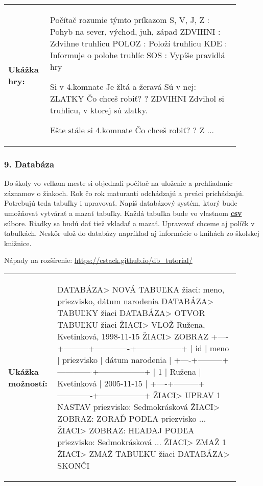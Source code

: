\begin{tabular}{@{}p{0.15\linewidth}p{0.75\linewidth}}
\textbf{\small Ukážka hry:} &
\vspace{-3em}
\begin{code}
Počítač rozumie týmto príkazom
S, V, J, Z   : Pohyb na sever, východ, juh, západ
ZDVIHNI		 : Zdvihne truhlicu
POLOZ		 : Položí truhlicu
KDE			 : Informuje o polohe truhlíc
SOS			 : Vypíše pravidlá hry

Si v 4.komnate
Je žltá a žeravá
Sú v nej: ZLATKY
Čo chceš robiť?
? ZDVIHNI
Zdvihol si truhlicu, v ktorej sú zlatky.

Ešte stále si 4.komnate
Čo chceš robiť?
? Z
...
\end{code}
\end{tabular}
\vspace{-2em}

\subsubsection*{9. Databáza}
Do školy vo veľkom meste si objednali počítač na uloženie a prehliadanie záznamov o žiakoch. Rok čo rok maturanti odchádzajú a prváci prichádzajú. Potrebujú teda tabuľky i upravovať. Napíš databázový systém, ktorý bude umožňovať vytvárať a mazať tabuľky. Každá tabuľka bude vo vlastnom \underline{\textbf{csv}} súbore. Riadky sa budú dať tiež vkladať a mazať.  Upravovať chceme aj políčk v tabuľkách. Neskôr ulož do databázy napríklad aj informácie o knihách zo školskej knižnice.

Nápady na rozšírenie: \url{https://cstack.github.io/db_tutorial/}

\begin{tabular}{@{}p{0.15\linewidth}p{0.75\linewidth}}
\textbf{\small Ukážka možností:} &
\vspace{-3em}
\begin{code}
DATABÁZA> NOVÁ TABUĽKA žiaci: meno, priezvisko, dátum narodenia
DATABÁZA> TABUĽKY
žiaci
DATABÁZA> OTVOR TABUĽKU žiaci
ŽIACI> VLOŽ Ružena, Kvetinková, 1998-11-15
ŽIACI> ZOBRAZ
   +----+---------+-------------+-----------------+
   | id |  meno   |  priezvisko | dátum narodenia |
   +----+---------+-------------+-----------------+
   | 1  |  Ružena | Kvetinková  |  2005-11-15     |
   +----+---------+-------------+-----------------+
ŽIACI> UPRAV 1 NASTAV priezvisko: Sedmokrásková
ŽIACI> ZOBRAZ: ZORAĎ PODĽA priezvisko
...
ŽIACI> ZOBRAZ: HĽADAJ PODĽA priezvisko: Sedmokrásková
...
ŽIACI> ZMAŽ 1
ŽIACI> ZMAŽ TABUĽKU žiaci
DATABÁZA> SKONČI
\end{code}
\end{tabular}
\vspace{-2em}

